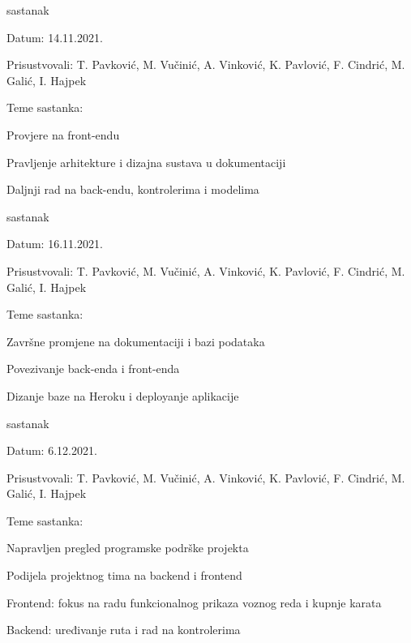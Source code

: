 \begin{packed_enum}
			
			\item  sastanak
			\item[] \begin{packed_item}
				\item Datum: 14.11.2021.
				\item Prisustvovali: T. Pavković, M. Vučinić, A. Vinković, K. Pavlović, F. Cindrić, M. Galić, I. Hajpek
				\item Teme sastanka:
				\begin{packed_item}
					\item  Provjere na front-endu
					\item  Pravljenje arhitekture i dizajna sustava u dokumentaciji
					\item  Daljnji rad na back-endu, kontrolerima i modelima
				\end{packed_item}
			\end{packed_item}

			
			\item  sastanak
			\item[] \begin{packed_item}
				\item Datum: 16.11.2021.
				\item Prisustvovali: T. Pavković, M. Vučinić, A. Vinković, K. Pavlović, F. Cindrić, M. Galić, I. Hajpek
				\item Teme sastanka:
				\begin{packed_item}
					\item  Završne promjene na dokumentaciji i bazi podataka
					\item  Povezivanje back-enda i front-enda
					\item  Dizanje baze na Heroku i deployanje aplikacije
				\end{packed_item}
			\end{packed_item}

			\item  sastanak
			\item[] \begin{packed_item}
				\item Datum: 6.12.2021.
				\item Prisustvovali: T. Pavković, M. Vučinić, A. Vinković, K. Pavlović, F. Cindrić, M. Galić, I. Hajpek
				\item Teme sastanka:
				\begin{packed_item}
					\item  Napravljen pregled programske podrške projekta
					\item  Podijela projektnog tima na backend i frontend
					\item  Frontend: fokus na radu funkcionalnog prikaza voznog reda i kupnje karata
					\item  Backend: uređivanje ruta i rad na kontrolerima 
				\end{packed_item}
			\end{packed_item}


\end{packed_enum}
